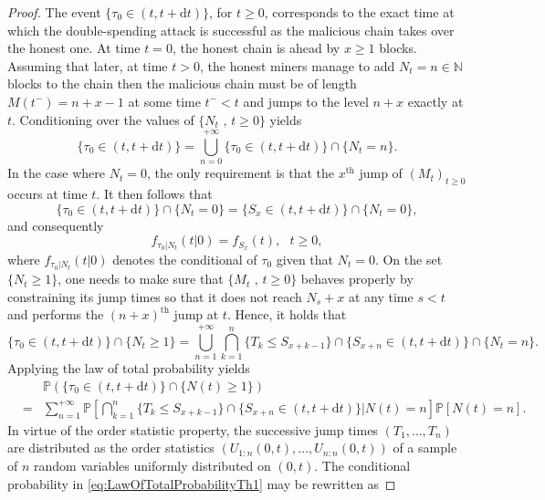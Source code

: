 \begin{proof}
The event $\{\tau_0\in(t,t+\text{d}t)\}$, for $t\geq0$, corresponds to the exact time at which the double-spending attack is successful as the malicious chain takes over the honest one. At time $t=0$, the honest chain is ahead by $x\geq 1$ blocks. Assuming that later, at time $t>0$, the honest miners manage to add $N_t=n\in\mathbb{N}$ blocks to the chain then the malicious chain must be of length $M(t^{-})=n+x-1$ at some time $t^{-}<t$ and jumps to the level $n+x$ exactly at $t$. Conditioning over the values of $\{N_t\text{ , }t\geq0\}$ yields
\begin{equation}\label{eq:Tauz}
\{\tau_0\in(t,t+\text{d}t)\}=\bigcup_{n=0}^{+\infty}\{\tau_0\in(t,t+\text{d}t)\}\cap\{N_t=n\}.
\end{equation}
In the case where $N_t=0$, the only requirement is that the $x^{\text{th}}$ jump of $(M_t)_{t\geq0}$ occurs at time $t$. It then follows that
\begin{equation}\label{eq:TauzNt0}
\{\tau_0\in(t,t+\text{d}t)\}\cap\{N_t=0\}=\{S_{x}\in(t,t+\text{d}t)\}\cap\{N_t=0\},
\end{equation}
and consequently
\begin{equation}\label{eq:PDFTauzNt0}
f_{\tau_0|N_t}(t|0)=f_{S_x}(t),\text{ }t\geq0,
\end{equation}
where $f_{\tau_0|N_t}(t|0)$ denotes the conditional \pdf of $\tau_0$ given that $N_t=0$. On the set $\{N_t\geq1\}$, one needs to make sure that $\{M_t\text{ , }t\geq0\}$ behaves properly by constraining its jump times so that it does not reach $N_s+x$ at any time $s<t$ and performs the $(n+x)^{\text{th}}$ jump at $t$. Hence, it holds that
\begin{equation*}
\{\tau_0\in(t,t+\text{d}t)\}\cap\{N_t\geq1\}=\bigcup_{n=1}^{+\infty}\bigcap_{k=1}^{n}\{T_k\leq S_{x+k-1}\}\cap\{S_{x+n}\in(t,t+\text{d}t)\}\cap\{N_t=n\}.
\end{equation*}
Applying the law of total probability yields
\begin{eqnarray}
&&\mathbb{P}\left(\{\tau_0\in(t,t+\text{d}t)\}\cap\{N(t)\geq1\}\right)\nonumber\\
&=&\sum_{n=1}^{+\infty}\mathbb{P}\left[\bigcap_{k=1}^{n}\{T_k\leq S_{x+k-1}\}\cap\{S_{x+n}\in(t,t+\text{d}t)\}\Big\rvert N(t)=n\right]\mathbb{P}[N(t)=n].\label{eq:LawOfTotalProbabilityTh1}
\end{eqnarray}
In virtue of the order statistic property, the successive jump times $(T_1,\ldots,T_n)$ are distributed as the order statistics $(U_{1:n}(0,t),\ldots,U_{n:n}(0,t))$ of a sample of $n$ \iid random variables uniformly distributed on $(0,t)$. The conditional probability in \eqref{eq:LawOfTotalProbabilityTh1} may be rewritten as

\end{proof}
